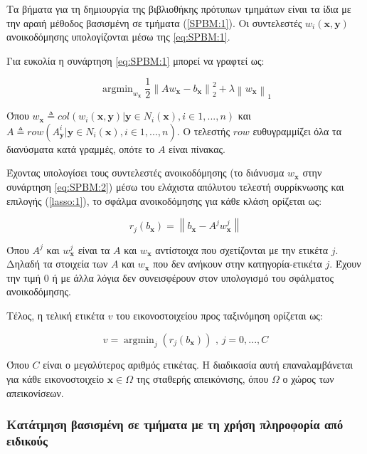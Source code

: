 \documentclass[a4paper,12pt]{article}
\newcommand{\argminB}{\mathop{\mathrm{argmin}}}
\newcommand\norm[1]{\left\lVert#1\right\rVert}
\begin{document}
Τα βήματα για τη δημιουργία της βιβλιοθήκης πρότυπων τμημάτων είναι τα ίδια με
την αραιή μέθοδος βασισμένη σε τμήματα (\ref{SPBM:1}). Οι συντελεστές
$w_i(\bm{x},\bm{y})$ ανοικοδόμησης υπολογίζονται μέσω της \eqref{eq:SPBM:1}.

Για ευκολία η συνάρτηση \eqref{eq:SPBM:1} μπορεί να γραφτεί ως:

\begin{equation} \label{eq:SPBM:2}
    \argminB_{w_{\bm{x}}} { \frac{1} {2} \norm { A w_{\bm{x}} - b_{\bm{x}} }_2^2
              + \lambda \norm{w_{\bm{x}}}_1 }
\end{equation}

Όπου $w_{\bm{x}} \triangleq col( w_i( \bm{x}, \bm{y}) | \bm{y} \in N_i( \bm{x}),
i \in {{1,...,n}})$ και \\
$A \triangleq row( {{A_{\bm{y}}^i | \bm{y} \in N_i(\bm{x}), i \in {{1,...,n}}
}})$. Ο τελεστής $row$ ευθυγραμμίζει όλα τα διανύσματα κατά γραμμές, οπότε το
$A$ είναι πίνακας.

Έχοντας υπολογίσει τους συντελεστές ανοικοδόμησης (το διάνυσμα $w_{\bm{x}}$ στην
συνάρτηση \eqref{eq:SPBM:2}) μέσω του ελάχιστα απόλυτου τελεστή συρρίκνωσης και
επιλογής (\ref{lasso:1}), το σφάλμα ανοικοδόμησης για κάθε κλάση ορίζεται ως:

\begin{equation} 
    r_j(b_{\bm{x}}) = \norm{ b_{\bm{x}} - A^j w_{\bm{x}}^j }
\end{equation}

Όπου $A^j$ και $w_{\bm{x}}^j$ είναι τα $A$ και $w_{\bm{x}}$ αντίστοιχα που
σχετίζονται με την ετικέτα $j$. Δηλαδή τα στοιχεία των $A$ και $w_{\bm{x}}$ που
δεν ανήκουν στην κατηγορία-ετικέτα $j$. Έχουν την τιμή $0$ ή με άλλα λόγια δεν
συνεισφέρουν στον υπολογισμό του σφάλματος ανοικοδόμησης.

Τέλος, η τελική ετικέτα $v$ του εικονοστοιχείου προς ταξινόμηση ορίζεται ως:

\begin{equation*} 
    v = \argminB_{j} { \left( r_j(b_{\bm{x}}) \right) } \text{ , } j = 0,...,C
\end{equation*}

Όπου $C$ είναι ο μεγαλύτερος αριθμός ετικέτας. Η διαδικασία αυτή επαναλαμβάνεται
για κάθε εικονοστοιχείο $\bm{x} \in \Omega$ της σταθερής απεικόνισης, όπου
$\Omega$ ο χώρος των απεικονίσεων.

\subsubsection{Κατάτμηση βασισμένη σε τμήματα με τη χρήση πληροφορία από
ειδικούς}
\end{document}

